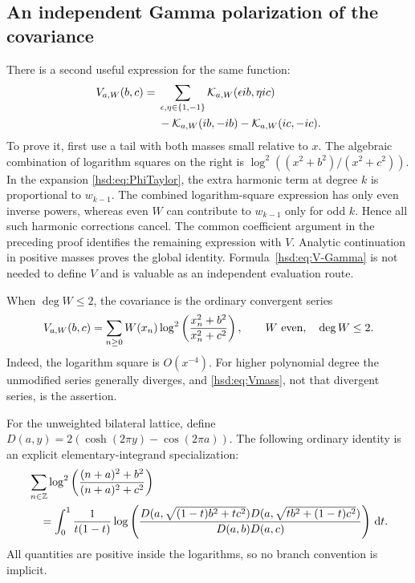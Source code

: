 \documentclass[11pt]{article}
\numberwithin{equation}{section}
\theoremstyle{definition}\newtheorem{definition}[theorem]{Definition}
\theoremstyle{remark}\newtheorem{remark}[theorem]{Remark}
\newcommand{\dd}{\,\mathrm d}
\newcommand{\KK}{\mathcal K}
\begin{document}
\subsection{An independent Gamma polarization of the covariance}
There is a second useful expression for the same function:
\begin{align}
 V_{a,W}(b,c)={}&\sum_{\epsilon,\eta\in\{1,-1\}}
                  \KK_{a,W}(\epsilon ib,\eta ic)\notag\\
               &-\KK_{a,W}(ib,-ib)-\KK_{a,W}(ic,-ic).
 \label{hsd:eq:V-Gamma}
\end{align}
To prove it, first use a tail with both masses small relative to $x$.
The algebraic combination of logarithm squares on the right is
$\log^2((x^2+b^2)/(x^2+c^2))$. In the expansion
\eqref{hsd:eq:PhiTaylor}, the extra harmonic term at degree $k$ is
proportional to $w_{k-1}$. The combined logarithm-square expression has
only even inverse powers, whereas even $W$ can contribute to
$w_{k-1}$ only for odd $k$. Hence all such harmonic corrections cancel.
The common coefficient argument in the preceding proof identifies the
remaining expression with $V$. Analytic continuation in positive masses
proves the global identity. Formula~\eqref{hsd:eq:V-Gamma} is not needed
to define $V$ and is valuable as an independent evaluation route.

When $\deg W\le2$, the covariance is the ordinary convergent series
\begin{equation}\label{hsd:eq:Vordinary}
 V_{a,W}(b,c)=\sum_{n\ge0}W(x_n)
                   \log^2\left(\frac{x_n^2+b^2}{x_n^2+c^2}\right),
 \qquad W\ \hbox{even},\quad\deg W\le2.
\end{equation}
Indeed, the logarithm square is $O(x^{-4})$. For higher polynomial
degree the unmodified series generally diverges, and
\eqref{hsd:eq:Vmass}, not that divergent series, is the assertion.

For the unweighted bilateral lattice, define
$D(a,y)=2(\cosh(2\pi y)-\cos(2\pi a))$. The following ordinary identity
is an explicit elementary-integrand specialization:
\begin{align}
 &\sum_{n\in\mathbb Z}
  \log^2\left(\frac{(n+a)^2+b^2}{(n+a)^2+c^2}\right)\notag\\
 &\quad=\int_0^1\frac1{t(1-t)}
 \log\left(\frac{D(a,\sqrt{(1-t)b^2+tc^2})
                  D(a,\sqrt{tb^2+(1-t)c^2})}{D(a,b)D(a,c)}\right)\dd t.
 \label{hsd:eq:V-elementary}
\end{align}
All quantities are positive inside the logarithms, so no branch convention
is implicit.
\end{document}
